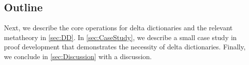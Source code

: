 \subsection{Outline}
%
Next, we describe the core operations for delta dictionaries and the relevant metatheory in \autoref{sec:DD}.
%
In \autoref{sec:CaseStudy}, we describe a small case study in proof development that demonstrates the necessity of delta dictionaries.
%
Finally, we conclude in \autoref{sec:Discussion} with a discussion. %
%
